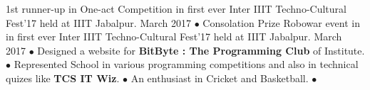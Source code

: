 \begin{cvhonors}
  
  \cvhonor
    {\small 1st  runner-up }
    {\small in One-act Competition in first ever Inter IIIT Techno-Cultural Fest’17 held at IIIT Jabalpur.}
    {\small March 2017}
    {$\bullet$}
  \cvhonor
    {\small Consolation Prize }
    {\small Robowar event in in first ever Inter IIIT Techno-Cultural Fest’17 held at IIIT Jabalpur.}
    {\small March 2017}
    {$\bullet$}
  \cvhonor
    {}
    {\small Designed a website for \textbf{BitByte : The Programming Club} of Institute.}
    {}
    {$\bullet$}
  \cvhonor
    {}
    {\small Represented School in various programming competitions and also in technical quizes like \textbf{TCS IT Wiz}.}
    {}
    {$\bullet$}
  \cvhonor
    {}
    {\small An enthusiast in Cricket and Basketball.}
    {}
    {$\bullet$}
\end{cvhonors}
